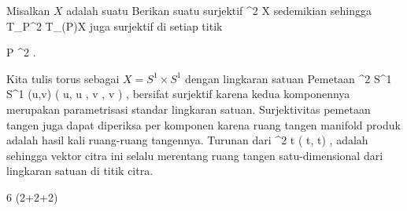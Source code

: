 {

Misalkan $X$ adalah suatu
Berikan suatu
surjektif
\maabbdisp {\varphi} {\R^2} {X
} {}
sedemikian sehingga
 { T_P\R^2 } { T_{\varphi(P)}X
} {}
juga surjektif di setiap titik

\mavergleichskette
{\vergleichskette
{ P
}
{ \in }{ \R^2
}
{  }{
}
{    }{
}
{   }{
}
}
{}{}{.}

}
{

Kita tulis torus sebagai $X=S^1 \times S^1$ dengan lingkaran satuan
Pemetaan
\maabbeledisp {\varphi} {\R^2} {S^1 \times S^1
} {(u,v)} {( \cos  u, \sin  u , \cos  v , \sin  v )
} {,}
bersifat surjektif karena kedua komponennya merupakan parametrisasi standar lingkaran satuan. Surjektivitas pemetaan tangen juga dapat diperiksa per komponen karena ruang tangen manifold produk adalah hasil kali ruang-ruang tangennya. Turunan dari
\maabbeledisp {} {\R} { \R^2
} { t } { ( \cos  t, \sin  t)
} {,}
adalah
 sehingga vektor citra ini selalu merentang ruang tangen satu-dimensional dari lingkaran satuan di titik citra.

}



{6 (2+2+2)}

